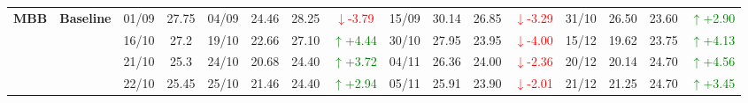 {\begin{longtable}{llcc|cccc|cccc|cccc}
\multirow{4}{*}{\textbf{MBB}}
& \textbf{Baseline}
& 01/09 & 27.75 & 04/09 & 24.46 & 28.25 & \textcolor{red}{\(\downarrow\)-3.79} & 15/09 & 30.14 & 26.85 & \textcolor{red}{\(\downarrow\)-3.29} & 31/10 & 26.50 & 23.60 & \textcolor{green}{\(\uparrow\)+2.90} \\
& & 16/10 & 27.2 & 19/10 & 22.66 & 27.10 & \textcolor{green}{\(\uparrow\)+4.44} & 30/10 & 27.95 & 23.95 & \textcolor{red}{\(\downarrow\)-4.00} & 15/12 & 19.62 & 23.75 & \textcolor{green}{\(\uparrow\)+4.13} \\
& & 21/10 & 25.3 & 24/10 & 20.68 & 24.40 & \textcolor{green}{\(\uparrow\)+3.72} & 04/11 & 26.36 & 24.00 & \textcolor{red}{\(\downarrow\)-2.36} & 20/12 & 20.14 & 24.70 & \textcolor{green}{\(\uparrow\)+4.56} \\
& & 22/10 & 25.45 & 25/10 & 21.46 & 24.40 & \textcolor{green}{\(\uparrow\)+2.94} & 05/11 & 25.91 & 23.90 & \textcolor{red}{\(\downarrow\)-2.01} & 21/12 & 21.25 & 24.70 & \textcolor{green}{\(\uparrow\)+3.45} \\
\midrule

\end{longtable}
}